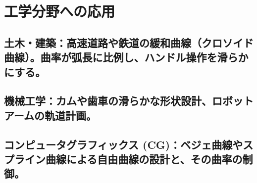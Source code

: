 \chapter{工学分野への応用}

\section{土木・建築：高速道路や鉄道の緩和曲線（クロソイド曲線）。曲率が弧長に比例し、ハンドル操作を滑らかにする。}

\section{機械工学：カムや歯車の滑らかな形状設計、ロボットアームの軌道計画。}

\section{コンピュータグラフィックス (CG)：ベジェ曲線やスプライン曲線による自由曲線の設計と、その曲率の制御。}
